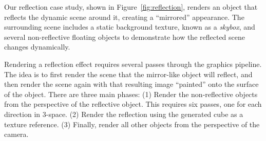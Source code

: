 {Our reflection case study, shown in Figure~\ref{fig:reflection}, renders an object that reflects the dynamic scene around it, creating a ``mirrored'' appearance.
The surrounding scene includes a static background texture, known as a \emph{skybox}, and several non-reflective floating objects to demonstrate how the reflected scene changes dynamically.

Rendering a reflection effect requires several passes through the graphics pipeline.
The idea is to first render the scene that the mirror-like object will reflect, and then render the scene again with that resulting image ``painted'' onto the surface of the object.
There are three main phases:
(1) Render the non-reflective objects from the perspective of the reflective object.
This requires six passes, one for each direction in 3-space.
(2) Render the reflection using the generated cube as a texture reference.
(3) Finally, render all other objects from the perspective of the camera.

}
